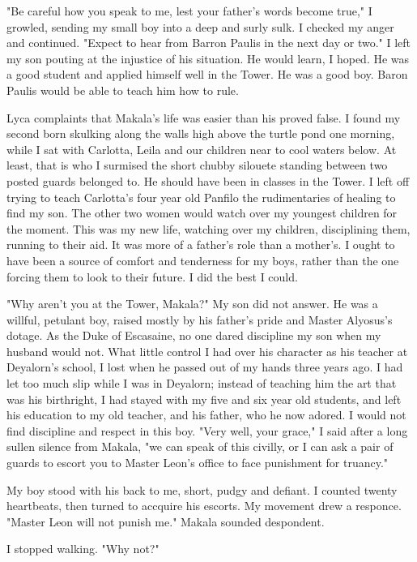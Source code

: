 \documentclass{article}
\begin{document}
"Be careful how you speak to me, lest your father's words become true," I growled, sending my small boy into a deep and surly sulk. I checked my anger and continued. "Expect to hear from Barron Paulis in the next day or two." I left my son pouting at the injustice of his situation. He would learn, I hoped. He was a good student and applied himself well in the Tower. He was a good boy. Baron Paulis would be able to teach him how to rule.

Lyca complaints that Makala's life was easier than his proved false. I found my second born skulking along the walls high above the turtle pond one morning, while I sat with Carlotta, Leila and our children near to cool waters below. At least, that is who I surmised the short chubby silouete standing between two posted guards belonged to. He should have been in classes in the Tower. I left off trying to teach Carlotta's four year old Panfilo the rudimentaries of healing to find my son. The other two women would watch over my youngest children for the moment. This was my new life, watching over my children, disciplining them, running to their aid. It was more of a father's role than a mother's. I ought to have been a source of comfort and tenderness for my boys, rather than the one forcing them to look to their future. I did the best I could. 

"Why aren't you at the Tower, Makala?" My son did not answer. He was a willful, petulant boy, raised mostly by his father's pride and Master Alyosus's dotage. As the Duke of Escasaine, no one dared discipline my son when my husband would not. What little control I had over his character as his teacher at Deyalorn's school, I lost when he passed out of my hands three years ago. I had let too much slip while I was in Deyalorn; instead of teaching him the art that was his birthright, I had stayed with my five and six year old students, and left his education to my old teacher, and his father, who he now adored. I would not find discipline and respect in this boy. "Very well, your grace," I said after a long sullen silence from Makala, "we can speak of this civilly, or I can ask a pair of guards to escort you to Master Leon's office to face punishment for truancy."

My boy stood with his back to me, short, pudgy and defiant. I counted twenty heartbeats, then turned to accquire his escorts. My movement drew a responce. "Master Leon will not punish me." Makala sounded despondent.

I stopped walking. "Why not?"
\end{document}
